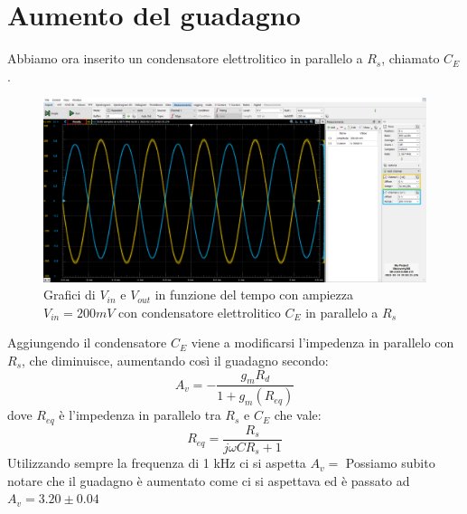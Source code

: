 \documentclass[10pt, a4paper, italian]{article}
\begin{document}
\section{Aumento del guadagno}
Abbiamo ora inserito un condensatore elettrolitico in parallelo a $R_s$, chiamato $C_E$.
\begin{figure}[H]
    \centering
	\includegraphics[scale=0.4]{amp.200.cap}
    \caption{Grafici di $V_{in}$ e $V_{out}$ in funzione del tempo con ampiezza $V_{in}=200 mV$ con condensatore elettrolitico $C_E$ in parallelo a $R_s$}
\end{figure}
Aggiungendo il condensatore $C_E$ viene a modificarsi l'impedenza in parallelo con $R_s$, che diminuisce, aumentando così il guadagno secondo:
\begin{equation}
A_v = -\frac{g_m R_d}{1+g_m (R_{eq})}
\end{equation}
dove $R_{eq}$ è l'impedenza in parallelo tra $R_s$ e $C_E$ che vale:
\begin{equation}
R_{eq} = \frac{R_s}{j\omega C R_s +1}
\end{equation}
Utilizzando sempre la frequenza di 1 kHz ci si aspetta $A_v =$
Possiamo subito notare che il guadagno è aumentato come ci si aspettava ed è passato ad $A_v =3.20 \pm 0.04$
\end{document}
